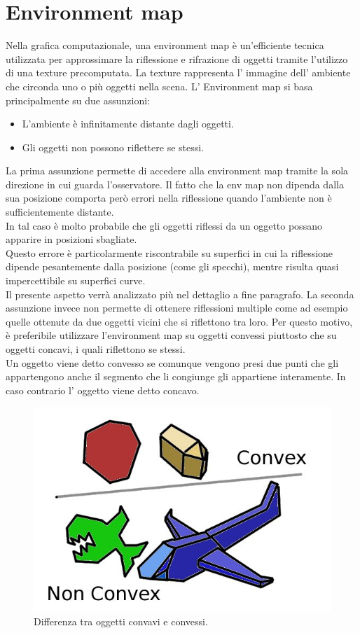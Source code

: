 \section{Environment map}
\label{sec:chapter_stato_arte_envmap}

Nella grafica computazionale, una environment map è un’efficiente tecnica utilizzata per approssimare la riflessione e rifrazione di oggetti tramite l’utilizzo di una texture precomputata.
La texture rappresenta l’ immagine dell’ ambiente che circonda uno o più oggetti nella scena.
L’ Environment map si basa principalmente su due assunzioni:
\begin{itemize}
\item L’ambiente è infinitamente distante dagli oggetti.
\item Gli oggetti non possono riflettere se stessi.
\end{itemize}
La prima assunzione permette di accedere alla environment map tramite la sola direzione in cui guarda l’osservatore. Il fatto che la env map non dipenda dalla sua posizione comporta però errori nella riflessione quando l’ambiente non è sufficientemente distante. 
\\
In tal caso è molto probabile che gli oggetti riflessi da un oggetto possano apparire in posizioni sbagliate.
\\
Questo errore è particolarmente riscontrabile su superfici in cui la riflessione dipende pesantemente dalla posizione (come gli specchi), mentre risulta quasi impercettibile su superfici curve. 
\\
Il presente aspetto verrà analizzato più nel dettaglio a fine paragrafo.
La seconda assunzione invece non permette di ottenere riflessioni multiple come ad esempio quelle ottenute da due oggetti vicini che si riflettono tra loro. Per questo motivo, è preferibile utilizzare l’environment map su oggetti convessi piuttosto che su oggetti concavi, i quali riflettono se stessi.
\\
Un oggetto viene detto convesso se comunque vengono presi due punti che gli appartengono anche il segmento che li congiunge gli appartiene interamente. In caso contrario l’ oggetto viene detto concavo. \cite{env1}
\begin{figure}[htb]
 \centering
 \includegraphics[width=0.5\linewidth]{images/chapter_stato_arte/stato_arte_conc_conv.jpg}\hfill
 \caption[Concavo,convesso]{Differenza tra oggetti convavi e convessi.}
 \label{fig:stato_arte_conc_conv}
\end{figure}
